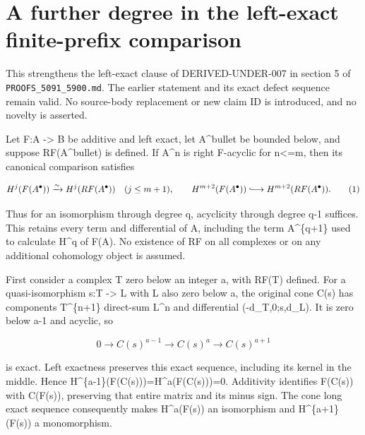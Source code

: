 \section{A further degree in the left-exact finite-prefix comparison}\label{proofs-5091-5900-addendum-01-a-further-degree-in-the-left-exact-finite-prefix-comparison}

This strengthens the left-exact clause of DERIVED-UNDER-007 in section 5 of \texttt{PROOFS\_\allowbreak{}5091\_\allowbreak{}5900.\allowbreak{}md}. The earlier statement and its exact defect sequence remain valid. No source-body replacement or new claim ID is introduced,\allowbreak{} and no novelty is asserted.

Let F:\allowbreak{}A \allowbreak{}-> B be additive and left exact,\allowbreak{} let A\^{}bullet be bounded below,\allowbreak{} and suppose RF(A\textasciicircum{}bullet)\allowbreak{} is defined. If A\^{}n is right F-acyclic for n<\allowbreak{}=m,\allowbreak{} then its canonical comparison satisfies

\[
 H^j(F(A^\bullet))\xrightarrow{\sim}H^j(RF(A^\bullet))
       \quad(j\le m+1),
 \qquad
 H^{m+2}(F(A^\bullet))\lhook\joinrel\longrightarrow
                                  H^{m+2}(RF(A^\bullet)).       \tag{1}
\]

Thus for an isomorphism through degree q,\allowbreak{} acyclicity through degree q-1 suffices. This retains every term and differential of A,\allowbreak{} including the term A\textasciicircum{}\{q\allowbreak{}+1\} used to calculate H\^{}q of F(A)\allowbreak{}. No existence of RF on all complexes or on any additional cohomology object is assumed.

First consider a complex T zero below an integer a,\allowbreak{} with RF(T)\allowbreak{} defined. For a quasi-isomorphism s:\allowbreak{}T \allowbreak{}-> L with L also zero below a,\allowbreak{} the original cone C(s)\allowbreak{} has components T\textasciicircum{}\{n\allowbreak{}+1\} direct-sum L\^{}n and differential (-d\_\allowbreak{}T,\allowbreak{}0;s,\allowbreak{}d\_\allowbreak{}L)\allowbreak{}. It is zero below a-1 and acyclic,\allowbreak{} so

\[
 0\longrightarrow C(s)^{a-1}\longrightarrow C(s)^a
                         \longrightarrow C(s)^{a+1}
\]

is exact. Left exactness preserves this exact sequence,\allowbreak{} including its kernel in the middle. Hence H\textasciicircum{}\{a-1\}(F(C(s)\allowbreak{})\allowbreak{})\allowbreak{}\allowbreak{}=H\textasciicircum{}a(F(C(s)\allowbreak{})\allowbreak{})\allowbreak{}\allowbreak{}=0. Additivity identifies F(C(s)\allowbreak{})\allowbreak{} with C(F(s)\allowbreak{})\allowbreak{},\allowbreak{} preserving that entire matrix and its minus sign. The cone long exact sequence consequently makes H\textasciicircum{}a(F(s)\allowbreak{})\allowbreak{} an isomorphism and H\textasciicircum{}\{a\allowbreak{}+1\}(F(s)\allowbreak{})\allowbreak{} a monomorphism.

